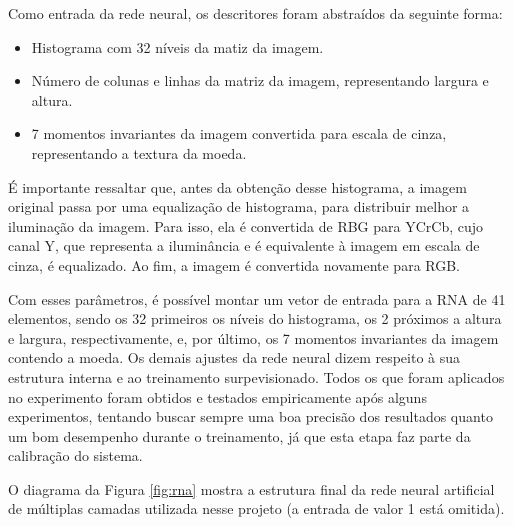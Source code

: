\documentclass[10pt,journal,compsoc]{IEEEtran}
\begin{document}
Como entrada da rede neural, os descritores foram abstraídos da seguinte forma:

\begin{itemize}  
\item Histograma com 32 níveis da matiz da imagem.
\item Número de colunas e linhas da matriz da imagem, representando largura e altura.
\item 7 momentos invariantes da imagem convertida para escala de cinza, representando a textura da moeda.
\end{itemize}

É importante ressaltar que, antes da obtenção desse histograma, a imagem original passa por uma equalização de histograma, para distribuir melhor a iluminação da imagem. Para isso, ela é convertida de RBG para YCrCb, cujo canal Y, que representa a iluminância e é equivalente à imagem em escala de cinza, é equalizado. Ao fim, a imagem é convertida novamente para RGB. 

Com esses parâmetros, é possível montar um vetor de entrada para a RNA  de 41 elementos, sendo os 32 primeiros os níveis do histograma, os 2 próximos a altura e largura, respectivamente, e, por último, os 7 momentos invariantes da imagem contendo a moeda. Os demais ajustes da rede neural dizem respeito à sua estrutura interna e ao treinamento surpevisionado. Todos os que foram aplicados no experimento foram obtidos e testados empiricamente após alguns experimentos, tentando buscar sempre uma boa precisão dos resultados quanto um bom desempenho durante o treinamento, já que esta etapa faz parte da calibração do sistema.

O diagrama da Figura \ref{fig:rna} mostra a estrutura final da rede neural artificial de múltiplas camadas utilizada nesse projeto (a entrada de valor 1 está omitida).

\end{document}
